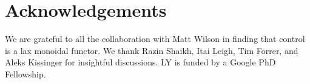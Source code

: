 \section{Acknowledgements}
We are grateful to all the collaboration with Matt Wilson in finding that control is a lax monoidal functor. We thank Razin Shaikh, Itai Leigh, Tim Forrer, and Aleks Kissinger for insightful discussions.
LY is funded by a Google PhD Fellowship.